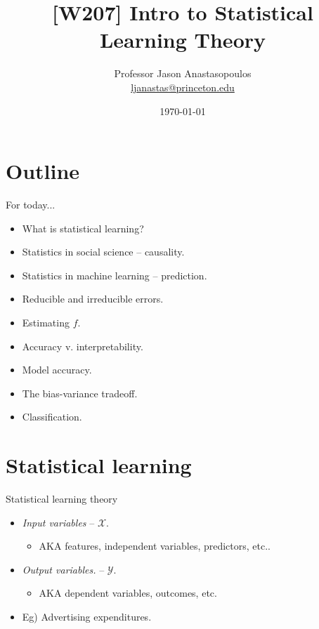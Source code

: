 \documentclass{beamer}
\title{[W207] Intro to Statistical Learning Theory}
\author{Professor Jason Anastasopoulos\\
			\href{ljanastas@princeton.edu}{ljanastas@princeton.edu}}
\institute{Princeton University
			}
\date{\today}
\begin{document}
\begin{frame} %
\titlepage
\end{frame}


\section*{Outline}

\begin{frame}{For today...} 
	\begin{itemize}
	 	\item What is statistical learning?
	 	\item Statistics in social science -- causality.
	 	\item Statistics in machine learning -- prediction.
	 	\item	Reducible and irreducible errors.
	 	\item Estimating $f$. 
	 	\item Accuracy v. interpretability.
	 	\item Model accuracy.
	 	\item The bias-variance tradeoff.
	 	\item Classification.
	\end{itemize}
\end{frame}

\section*{Statistical learning}

\begin{frame}{Statistical learning theory} %

 \begin{itemize}
 	\item \textit{Input variables} -- $\mathcal{X}$.
 		\begin{itemize}
 			\item AKA features, independent variables, predictors, etc..
 		\end{itemize}
 	\item \textit{Output variables.} -- $\mathcal{Y}$.
 				\begin{itemize}
 			\item AKA dependent variables, outcomes, etc.
 		\end{itemize}
 	\item Eg) Advertising expenditures.
 \end{itemize}
\end{frame}
\end{document}
